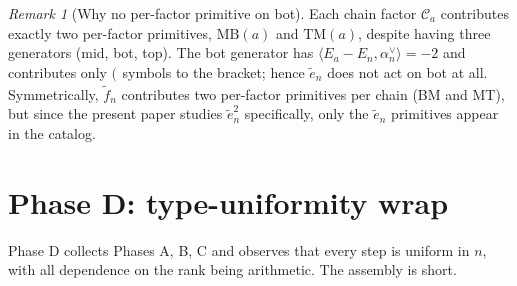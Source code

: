 \documentclass[11pt]{article}
\theoremstyle{definition}
\theoremstyle{remark}
\newtheorem{remark}[theorem]{Remark}
\newcommand{\MB}{\mathrm{MB}}
\newcommand{\TM}{\mathrm{TM}}
\newcommand{\Cmid}{\mathcal{C}}
\newcommand{\labl}[1]{{(}_{#1}}
\begin{document}
\begin{remark}[Why no per-factor primitive on bot]\label{rmk:no-bot-primitive}
Each chain factor $\Cmid_a$ contributes exactly two per-factor primitives, $\MB(a)$
and $\TM(a)$, despite having three generators (mid, bot, top). The bot generator
has $\langle E_a - E_n, \alpha_n^\vee\rangle = -2$ and contributes only $\labl{}$
symbols to the bracket; hence $\tilde e_n$ does not act on bot at all. Symmetrically,
$\tilde f_n$ contributes two per-factor primitives per chain (BM and MT), but
since the present paper studies $\tilde e_n^2$ specifically, only the
$\tilde e_n$ primitives appear in the catalog.
\end{remark}

\section{Phase D: type-uniformity wrap}\label{sec:phaseD}

Phase D collects Phases A, B, C and observes that every step is uniform in $n$,
with all dependence on the rank being arithmetic. The assembly is short.
\end{document}
